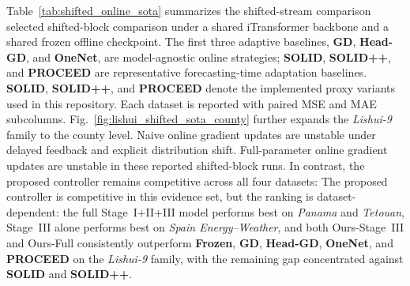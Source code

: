 ﻿\documentclass[journal]{IEEEtran}
\DeclareRobustCommand{\oldtext}[1]{{\color{revisionred}#1}}
\DeclareRobustCommand{\newtext}[1]{{\color{revisionblue}#1}}
\DeclareRobustCommand{\why}[1]{{\color{revisionblue}{\footnotesize (#1)}}}
\DeclareRobustCommand{\rw}[3]{\oldtext{#1} \newtext{#2}\why{#3}}
\begin{document}
Table~\ref{tab:shifted_online_sota} summarizes the \rw{shifted-stream comparison}{selected shifted-block comparison}{协议名称更精确} under a shared iTransformer backbone and a shared frozen offline checkpoint. The first three adaptive baselines, \textbf{GD}, \textbf{Head-GD}, and \textbf{OneNet}, are model-agnostic online strategies; \rw{\textbf{SOLID}, \textbf{SOLID++}, and \textbf{PROCEED} are representative forecasting-time adaptation baselines.}{\textbf{SOLID}, \textbf{SOLID++}, and \textbf{PROCEED} denote the implemented proxy variants used in this repository.}{避免把内部实现写成已核验外部基线。} Each dataset is reported with paired MSE and MAE subcolumns. Fig.~\ref{fig:lishui_shifted_sota_county} further expands the \textit{Lishui-9} family to the county level. \rw{Naive online gradient updates are unstable under delayed feedback and explicit distribution shift.}{Full-parameter online gradient updates are unstable in these reported shifted-block runs.}{限定到当前结果，避免泛化。} \rw{In contrast, the proposed controller remains competitive across all four datasets:}{The proposed controller is competitive in this evidence set, but the ranking is dataset-dependent:}{更准确承认 Lishui 与 SOLID++ 差距。} the full Stage~I+II+III model performs best on \textit{Panama} and \textit{Tetouan}, Stage~III alone performs best on \textit{Spain Energy--Weather}, and both Ours-Stage~III and Ours-Full consistently outperform \textbf{Frozen}, \textbf{GD}, \textbf{Head-GD}, \textbf{OneNet}, and \textbf{PROCEED} on the \textit{Lishui-9} family, with the remaining gap concentrated against \textbf{SOLID} and \textbf{SOLID++}.
\end{document}
